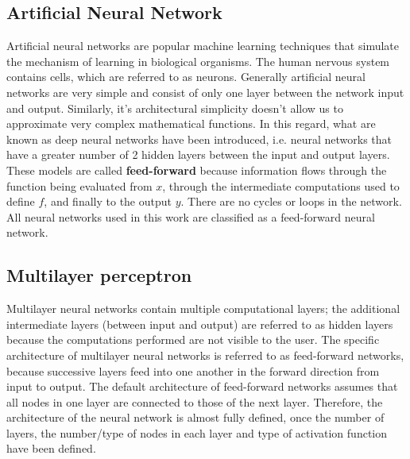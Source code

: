 \documentclass{article}
\begin{document}
\subsection{Artificial Neural Network}
Artificial neural networks are popular machine learning techniques that simulate the mechanism of learning in biological organisms. The human nervous system contains cells, which are referred to as neurons.\cite{Aggarwal2018} Generally artificial neural networks are very simple and consist of only one layer between the network input and output. Similarly, it's architectural simplicity doesn't allow us to approximate very complex mathematical functions. In this regard, what are known as deep neural networks have been introduced, i.e. neural networks that have a greater number of 2 hidden layers between the input and output layers. These models are called \textbf{feed-forward} because information ﬂows through the function being evaluated from $x$, through the intermediate computations used to deﬁne $f$, and ﬁnally to the output $y$. There are no cycles or loops in the network.\cite{goodfellow2016deep} All neural networks used in this work are classified as a feed-forward neural network.

\subsection{Multilayer perceptron}
Multilayer neural networks contain multiple computational layers; the additional intermediate layers (between input and output) are referred to as hidden layers because the computations performed are not visible to the user.
The specific architecture of multilayer neural networks is referred to as feed-forward networks, because successive layers feed into one another in the forward direction from input to output. The default architecture of feed-forward networks assumes that all nodes in one layer are connected to those of the next layer. Therefore, the architecture of the neural network is almost fully defined, once the number of layers, the number/type of nodes in each layer and type of activation function have been defined.\cite{Aggarwal2018}
\end{document}
